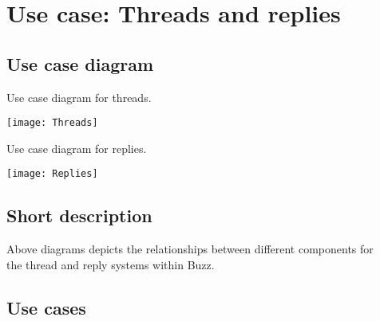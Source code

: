 

\section{Use case: Threads and replies}
	\subsection{Use case diagram}
	\begin{description}
		\item[Use case diagram for threads.] 
	\end{description}
	\texttt{[image: Threads]}
\newpage
		\begin{description}
			\item[Use case diagram for replies.] 
		\end{description}
\texttt{[image: Replies]}
	
	\subsection{Short description}
	\begin{description}
		\item[Above diagrams depicts the relationships between different components for ]
		 \item[the thread and reply systems within Buzz.] 
	\end{description}
	\subsection{Use cases}


